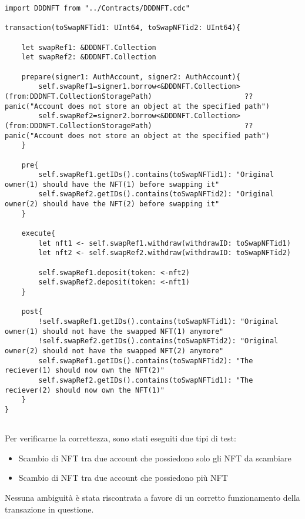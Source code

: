 \begin{lstlisting}[style=all, style=cadence]
import DDDNFT from "../Contracts/DDDNFT.cdc"

transaction(toSwapNFTid1: UInt64, toSwapNFTid2: UInt64){

    let swapRef1: &DDDNFT.Collection
    let swapRef2: &DDDNFT.Collection

    prepare(signer1: AuthAccount, signer2: AuthAccount){
        self.swapRef1=signer1.borrow<&DDDNFT.Collection>(from:DDDNFT.CollectionStoragePath)                      ?? panic("Account does not store an object at the specified path")
        self.swapRef2=signer2.borrow<&DDDNFT.Collection>(from:DDDNFT.CollectionStoragePath)                      ?? panic("Account does not store an object at the specified path")
    }

    pre{
        self.swapRef1.getIDs().contains(toSwapNFTid1): "Original owner(1) should have the NFT(1) before swapping it"
        self.swapRef2.getIDs().contains(toSwapNFTid2): "Original owner(2) should have the NFT(2) before swapping it"
    }

    execute{
        let nft1 <- self.swapRef1.withdraw(withdrawID: toSwapNFTid1)
        let nft2 <- self.swapRef2.withdraw(withdrawID: toSwapNFTid2)

        self.swapRef1.deposit(token: <-nft2)
        self.swapRef2.deposit(token: <-nft1)
    }

    post{
        !self.swapRef1.getIDs().contains(toSwapNFTid1): "Original owner(1) should not have the swapped NFT(1) anymore"
        !self.swapRef2.getIDs().contains(toSwapNFTid2): "Original owner(2) should not have the swapped NFT(2) anymore"
        self.swapRef1.getIDs().contains(toSwapNFTid2): "The reciever(1) should now own the NFT(2)"
        self.swapRef2.getIDs().contains(toSwapNFTid1): "The reciever(2) should now own the NFT(1)"
    }
}
    
\end{lstlisting}

Per verificarne la correttezza, sono stati eseguiti due tipi di test:

\begin{itemize}
    \item Scambio di NFT tra due account che possiedono solo gli NFT da scambiare
    \item Scambio di NFT tra due account che possiedono più NFT
\end{itemize}

Nessuna ambiguità è stata riscontrata a favore di un corretto funzionamento della transazione in questione.